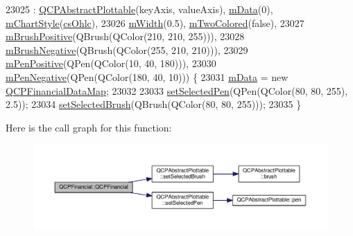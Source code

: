 \begin{DoxyCode}
23025     : \hyperlink{class_q_c_p_abstract_plottable_af78a036e40db6f53a31abadc5323715a}{QCPAbstractPlottable}(keyAxis, valueAxis), \hyperlink{class_q_c_p_financial_a475f63587ca1077d8c30aaf2b71ae026}{mData}(0), 
      \hyperlink{class_q_c_p_financial_ab65c2ce8d6354451870bb44b894c1e92}{mChartStyle}(\hyperlink{class_q_c_p_financial_a0f800e21ee98d646dfc6f8f89d10ebfba3a516016c9298d3e95dd82aa203c4390}{csOhlc}),
23026       \hyperlink{class_q_c_p_financial_af630e5eb8485146b9c777e63fd1cf993}{mWidth}(0.5), \hyperlink{class_q_c_p_financial_a6afe919190b884d9bac026cefcc8c0a8}{mTwoColored}(\textcolor{keyword}{false}),
23027       \hyperlink{class_q_c_p_financial_ab7e6eed16260a2f88ca6bd940dffea79}{mBrushPositive}(QBrush(QColor(210, 210, 255))),
23028       \hyperlink{class_q_c_p_financial_acb0e31874b7a1deb56bd42e8ab3e68f2}{mBrushNegative}(QBrush(QColor(255, 210, 210))),
23029       \hyperlink{class_q_c_p_financial_aa6599186f417ba615caebb3f6c762bd8}{mPenPositive}(QPen(QColor(10, 40, 180))),
23030       \hyperlink{class_q_c_p_financial_a263fbfefde2cc19c8d4024a8319c2bbb}{mPenNegative}(QPen(QColor(180, 40, 10))) \{
23031   \hyperlink{class_q_c_p_financial_a475f63587ca1077d8c30aaf2b71ae026}{mData} = \textcolor{keyword}{new} \hyperlink{qcustomplot_8h_a745c09823fae0974b50beca9bc3b3d7d}{QCPFinancialDataMap};
23032 
23033   \hyperlink{class_q_c_p_abstract_plottable_a6911603cad23ab0469b108224517516f}{setSelectedPen}(QPen(QColor(80, 80, 255), 2.5));
23034   \hyperlink{class_q_c_p_abstract_plottable_ae8c816874089f7a44001e8618e81a9dc}{setSelectedBrush}(QBrush(QColor(80, 80, 255)));
23035 \}
\end{DoxyCode}


Here is the call graph for this function\+:\nopagebreak
\begin{figure}[H]
\begin{center}
\leavevmode
\includegraphics[width=350pt]{class_q_c_p_financial_a4702d5248feeb9d1ec6e3ce725b10b32_cgraph}
\end{center}
\end{figure}


\hypertarget{class_q_c_p_financial_ad1fda0d793797b66819fac4682b10f31}{}
